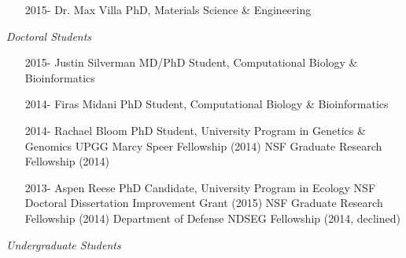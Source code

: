 \documentclass[overlapped,line,11pt]{res}
\begin{document}
\begin{resume}
\begin{itemize}[leftmargin=2cm, style=sameline, itemsep=0mm]
\item[2015-] Dr. Max Villa \newline 
  PhD, Materials Science \& Engineering
\end{itemize}

\vspace{-.1in}
\emph{Doctoral Students}
\vspace{.1in}

\begin{itemize}[leftmargin=2cm, style=sameline, itemsep=0mm]

\item[2015-] Justin Silverman \newline 
  MD/PhD Student, Computational Biology \& Bioinformatics
\item[2014-] Firas Midani \newline 
  PhD Student, Computational Biology \& Bioinformatics
\item[2014-] Rachael Bloom \newline 
  PhD Student, University Program in Genetics \& Genomics \newline
  UPGG Marcy Speer Fellowship (2014) \newline
  NSF Graduate Research Fellowship (2014)
\item[2013-] Aspen Reese \newline 
  PhD Candidate, University Program in Ecology \newline
  NSF Doctoral Dissertation Improvement Grant (2015) \newline
  NSF Graduate Research Fellowship (2014) \newline
  Department of Defense NDSEG Fellowship (2014, declined)

\end{itemize}

\vspace{-.1in}
\emph{Undergraduate Students}
\vspace{.1in}
\begin{itemize}[leftmargin=2cm, style=sameline, itemsep=0mm]


\end{itemize}
\end{resume}
\end{document}

